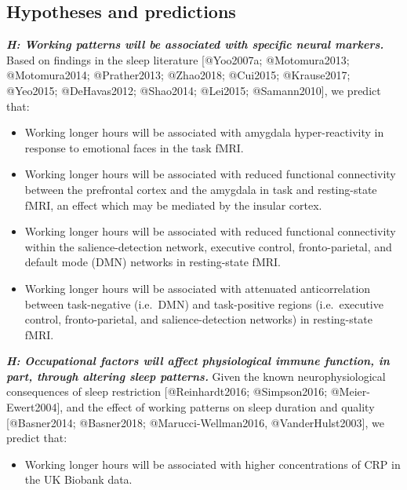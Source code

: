 \documentclass[
]{article}
\providecommand{\tightlist}{%
  \setlength{\itemsep}{0pt}\setlength{\parskip}{0pt}}
\begin{document}
\newpage

\hypertarget{hypotheses-and-predictions}{%
\subsection{Hypotheses and
predictions}\label{hypotheses-and-predictions}}

\textbf{\emph{H: Working patterns will be associated with specific
neural markers.}} Based on findings in the sleep literature
{[}@Yoo2007a; @Motomura2013; @Motomura2014; @Prather2013; @Zhao2018;
@Cui2015; @Krause2017; @Yeo2015; @DeHavas2012; @Shao2014; @Lei2015;
@Samann2010{]}, we predict that:

\begin{itemize}
\item
  Working longer hours will be associated with amygdala hyper-reactivity
  in response to emotional faces in the task fMRI.
\item
  Working longer hours will be associated with reduced functional
  connectivity between the prefrontal cortex and the amygdala in task
  and resting-state fMRI, an effect which may be mediated by the insular
  cortex.
\item
  Working longer hours will be associated with reduced functional
  connectivity within the salience-detection network, executive control,
  fronto-parietal, and default mode (DMN) networks in resting-state
  fMRI.
\item
  Working longer hours will be associated with attenuated
  anticorrelation between task-negative (i.e.~DMN) and task-positive
  regions (i.e.~executive control, fronto-parietal, and
  salience-detection networks) in resting-state fMRI.
\end{itemize}

\hspace{1cm}

\textbf{\emph{H: Occupational factors will affect physiological immune
function, in part, through altering sleep patterns.}} Given the known
neurophysiological consequences of sleep restriction {[}@Reinhardt2016;
@Simpson2016; @Meier-Ewert2004{]}, and the effect of working patterns on
sleep duration and quality {[}@Basner2014; @Basner2018;
@Marucci-Wellman2016, @VanderHulst2003{]}, we predict that:

\begin{itemize}
\tightlist
\item
  Working longer hours will be associated with higher concentrations of
  CRP in the UK Biobank data.
\end{itemize}
\end{document}

